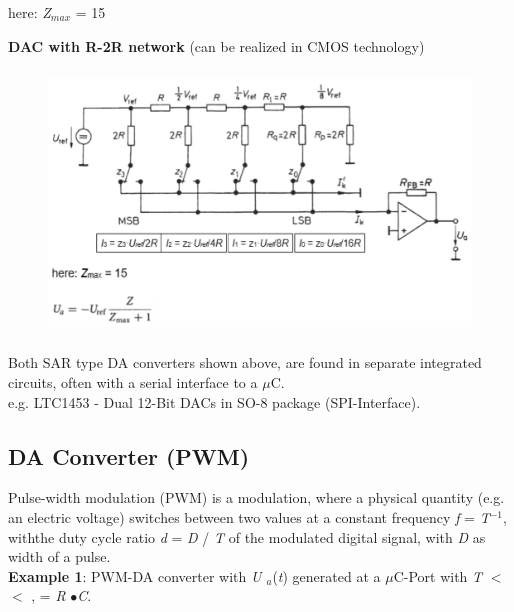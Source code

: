 here: \textit{Z}${}_{max}$ = 15\\

\os{\newpage}

{\rot\bf DAC with R-2R network} (can be realized in CMOS technology)

    \begin{figure}[h]
    \centering
    \includegraphics[width=14cm, height=7cm]{Images/image166.png}
    \label{fig:Fig 120}
    \end{figure}

Both SAR type DA converters shown above, are found in separate integrated circuits, often with a serial interface to a $\mu$C. \\

e.g. LTC1453 - Dual 12-Bit DACs in SO-8 package (SPI-Interface).\\

\newpage

\subsection{DA Converter (PWM)}

Pulse-width modulation (PWM) is a modulation, where a physical quantity (e.g. an electric voltage) switches between two values at a constant frequency \textit{f}  = \textit{T}${}^{-1}$, withthe duty cycle ratio \textit{d} = \textit{D} / \textit{T} of the modulated digital signal, with \textit{D} as width of a pulse.\\

\textbf{Example 1}:  PWM-DA converter with \textit{U ${}_{a}$}(\textit{t}) generated at a $\mu$C-Port with \textit{T} $\mathrm{<}$ $\mathrm{<}$ ,  = \textit{R} $\mathrm{\bullet}$\textit{C}.

